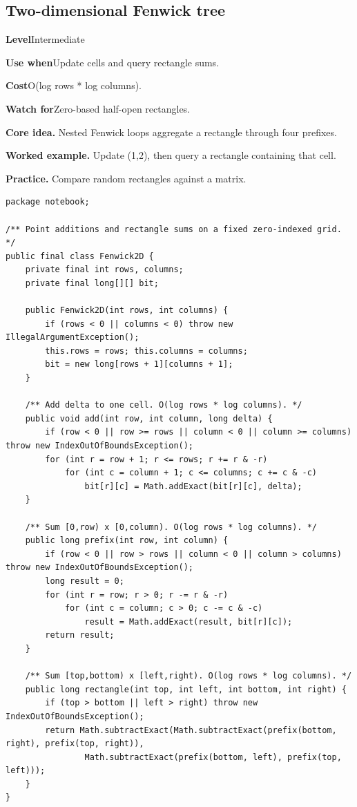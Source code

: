\documentclass[10pt,letterpaper]{article}
\newcommand{\entrylabel}[1]{\textcolor{accent}{\bfseries #1}}
\begin{document}
\subsection{Two-dimensional Fenwick tree}
\begin{guidebox}\small
\entrylabel{Level}\quad Intermediate\par
\entrylabel{Use when}\quad Update cells and query rectangle sums.\par
\entrylabel{Cost}\quad O(log rows * log columns).\par
\entrylabel{Watch for}\quad Zero-based half-open rectangles.\par
\end{guidebox}
\noindent\textbf{Core idea.} Nested Fenwick loops aggregate a rectangle through four prefixes.\par
\noindent\textbf{Worked example.} Update (1,2), then query a rectangle containing that cell.\par
\noindent\textbf{Practice.} Compare random rectangles against a matrix.\par
\begin{lstlisting}
package notebook;

/** Point additions and rectangle sums on a fixed zero-indexed grid. */
public final class Fenwick2D {
    private final int rows, columns;
    private final long[][] bit;

    public Fenwick2D(int rows, int columns) {
        if (rows < 0 || columns < 0) throw new IllegalArgumentException();
        this.rows = rows; this.columns = columns;
        bit = new long[rows + 1][columns + 1];
    }

    /** Add delta to one cell. O(log rows * log columns). */
    public void add(int row, int column, long delta) {
        if (row < 0 || row >= rows || column < 0 || column >= columns) throw new IndexOutOfBoundsException();
        for (int r = row + 1; r <= rows; r += r & -r)
            for (int c = column + 1; c <= columns; c += c & -c)
                bit[r][c] = Math.addExact(bit[r][c], delta);
    }

    /** Sum [0,row) x [0,column). O(log rows * log columns). */
    public long prefix(int row, int column) {
        if (row < 0 || row > rows || column < 0 || column > columns) throw new IndexOutOfBoundsException();
        long result = 0;
        for (int r = row; r > 0; r -= r & -r)
            for (int c = column; c > 0; c -= c & -c)
                result = Math.addExact(result, bit[r][c]);
        return result;
    }

    /** Sum [top,bottom) x [left,right). O(log rows * log columns). */
    public long rectangle(int top, int left, int bottom, int right) {
        if (top > bottom || left > right) throw new IndexOutOfBoundsException();
        return Math.subtractExact(Math.subtractExact(prefix(bottom, right), prefix(top, right)),
                Math.subtractExact(prefix(bottom, left), prefix(top, left)));
    }
}
\end{lstlisting}
\end{document}

